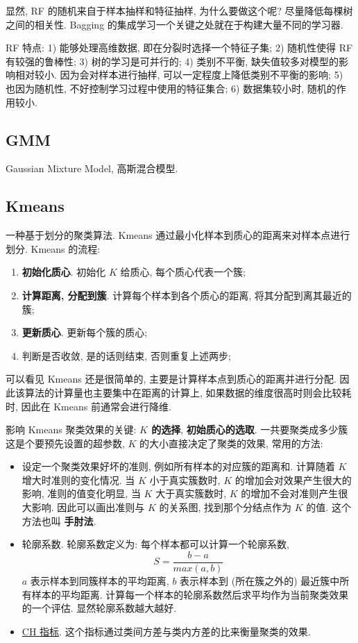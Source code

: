 显然, RF 的随机来自于样本抽样和特征抽样, 为什么要做这个呢? 尽量降低每棵树之间的相关性. Bagging 的集成学习一个关键之处就在于构建大量不同的学习器.

RF 特点: 1) 能够处理高维数据, 即在分裂时选择一个特征子集; 2) 随机性使得 RF 有较强的鲁棒性; 3) 树的学习是可并行的; 4) 类别不平衡, 缺失值较多对模型的影响相对较小. 因为会对样本进行抽样, 可以一定程度上降低类别不平衡的影响; 5) 也因为随机性, 不好控制学习过程中使用的特征集合; 6) 数据集较小时, 随机的作用较小.

\subsection{GMM}
Gaussian Mixture Model, 高斯混合模型. 

\subsection{Kmeans}
一种基于划分的聚类算法. Kmeans 通过最小化样本到质心的距离来对样本点进行划分. Kmeans 的流程:
\begin{enumerate}
	\item \textbf{初始化质心}. 初始化 $K$ 给质心, 每个质心代表一个簇;
	
	\item \textbf{计算距离, 分配到簇}. 计算每个样本到各个质心的距离, 将其分配到离其最近的簇;
	
	\item \textbf{更新质心}. 更新每个簇的质心;
	
	\item 判断是否收敛, 是的话则结束, 否则重复上述两步;
\end{enumerate}

可以看见 Kmeans 还是很简单的, 主要是计算样本点到质心的距离并进行分配. 因此该算法的计算量也主要集中在距离的计算上, 如果数据的维度很高时则会比较耗时, 因此在 Kmeans 前通常会进行降维.

影响 Kmeans 聚类效果的关键: \textbf{$K$ 的选择}, \textbf{初始质心的选取}. 一共要聚类成多少簇这是个要预先设置的超参数, $K$ 的大小直接决定了聚类的效果, 常用的方法:
\begin{itemize}
	\item 设定一个聚类效果好坏的准则, 例如所有样本的对应簇的距离和. 计算随着 $K$ 增大时准则的变化情况. 当 $K$ 小于真实簇数时, $K$ 的增加会对效果产生很大的影响, 准则的值变化明显, 当 $K$ 大于真实簇数时, $K$ 的增加不会对准则产生很大影响. 因此可以画出准则与 $K$ 的关系图, 找到那个分结点作为 $K$ 的值. 这个方法也叫 \textbf{手肘法}.
	
	\item 轮廓系数. 轮廓系数定义为: 每个样本都可以计算一个轮廓系数, 
	$$
	S = \frac{b - a}{max(a, b)}
	$$
	$a$ 表示样本到同簇样本的平均距离, $b$ 表示样本到 (所在簇之外的) 最近簇中所有样本的平均距离. 计算每一个样本的轮廓系数然后求平均作为当前聚类效果的一个评估. 显然轮廓系数越大越好. 
	
	\item \href{https://scikit-learn.org/stable/modules/clustering.html#calinski-harabasz-index}{CH 指标}. 这个指标通过类间方差与类内方差的比来衡量聚类的效果.
\end{itemize} 

